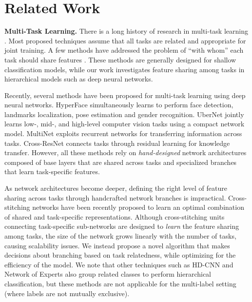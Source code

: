 \documentclass[10pt,twocolumn,letterpaper]{article}
\begin{document}
\section{Related Work}

{\bf Multi-Task Learning.} There is a long history of research in multi-task learning \cite{Caruana97,Thrun98,jacob2009clustered,Abhishek12,Misra16}. Most proposed techniques assume that all tasks are related and appropriate for joint training. A few methods have addressed the problem of ``with whom'' each task should share features \cite{xue2007multi,jacob2009clustered,zhou2011clustered,Kristen11,Abhishek12,passos2012flexible}. These methods are generally designed for shallow classification models, while our work investigates feature sharing among tasks in hierarchical models such as deep neural networks.

Recently, several methods have been proposed for multi-task learning using deep neural networks. HyperFace \cite{HyperFace16} simultaneously learns to perform face detection, landmarks localization, pose estimation and gender recognition. UberNet \cite{UberNet16} jointly learns low-, mid-, and high-level computer vision tasks using a compact network model.  MultiNet \cite{MultiNet16} exploits recurrent networks for transferring information across tasks. Cross-ResNet \cite{Brendan16} connects tasks through residual learning for knowledge transfer. However, all these methods rely on {\em hand-designed} network architectures composed of base layers that are shared across tasks and specialized branches that learn task-specific features.

As network architectures become deeper, defining the right level of feature sharing across tasks through handcrafted network branches is impractical. Cross-stitching networks \cite{Misra16} have been recently proposed to learn an optimal combination of shared and task-specific representations. Although cross-stitching units connecting task-specific sub-networks are designed to \emph{learn} the  feature sharing among tasks, 
the size of the network grows linearly with the number of tasks, causing scalability issues. We instead propose a novel algorithm that makes decisions about branching  based on task relatedness, while optimizing for the efficiency of the model. We note that other techniques such as HD-CNN \cite{HDCNN15} and Network of Experts \cite{ahmed2016network} also group related classes to perform hierarchical classification, but these methods are not applicable for the multi-label setting (where labels are not mutually exclusive).
\end{document}
